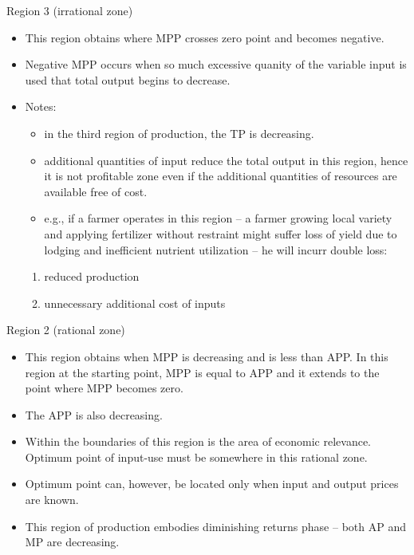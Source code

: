 \documentclass[12pt,ignorenonframetext,aspectratio=169]{beamer}
\providecommand{\tightlist}{%
  \setlength{\itemsep}{0pt}\setlength{\parskip}{0pt}}
\begin{document}
\begin{frame}{Region 3 (irrational zone)}
\protect\hypertarget{region-3-irrational-zone}{}
\begin{itemize}
\tightlist
\item
  This region obtains where MPP crosses zero point and becomes negative.
\item
  Negative MPP occurs when so much excessive quanity of the variable
  input is used that total output begins to decrease.
\item
  Notes:

  \begin{itemize}
  \tightlist
  \item
    in the third region of production, the TP is decreasing.
  \item
    additional quantities of input reduce the total output in this
    region, hence it is not profitable zone even if the additional
    quantities of resources are available free of cost.
  \item
    e.g., if a farmer operates in this region -- a farmer growing local
    variety and applying fertilizer without restraint might suffer loss
    of yield due to lodging and inefficient nutrient utilization -- he
    will incurr double loss:
  \end{itemize}

  \begin{enumerate}
  \tightlist
  \item
    reduced production
  \item
    unnecessary additional cost of inputs
  \end{enumerate}
\end{itemize}
\end{frame}

\begin{frame}{Region 2 (rational zone)}
\protect\hypertarget{region-2-rational-zone}{}
\begin{itemize}
\tightlist
\item
  This region obtains when MPP is decreasing and is less than APP. In
  this region at the starting point, MPP is equal to APP and it extends
  to the point where MPP becomes zero.
\item
  The APP is also decreasing.
\item
  Within the boundaries of this region is the area of economic
  relevance. Optimum point of input-use must be somewhere in this
  rational zone.
\item
  Optimum point can, however, be located only when input and output
  prices are known.
\item
  This region of production embodies diminishing returns phase -- both
  AP and MP are decreasing.
\end{itemize}
\end{frame}
\end{document}
